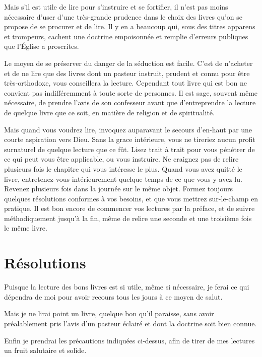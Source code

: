 \documentclass[instructions.tex]{subfiles}
\begin{document}
\tertio Mais s'il est utile de lire pour s'instruire et se fortifier, il n'est pas moins nécessaire d'user d'une très-grande prudence dans le choix des livres qu'on se propose de se procurer et de lire. Il y en a beaucoup qui, sous des titres apparens et trompeurs, cachent une doctrine empoisonnée et remplie d'erreurs publiques que l'Église a proscrites.
 
Le moyen de se préserver du danger de la séduction est facile. C'est de n'acheter et de ne lire que des livres dont un pasteur instruit, prudent et connu pour être très-orthodoxe, vous conseillera la lecture. Cependant tout livre qui est bon ne convient pas indifféremment à toute sorte de personnes. Il est sage, souvent même nécessaire, de prendre l'avis de son confesseur avant que d'entreprendre la lecture de quelque livre que ce soit, en matière de religion et de spiritualité.
 
\quarto Mais quand vous voudrez lire, invoquez auparavant le secours d'en-haut par une courte aspiration vers Dieu. Sans la grace intérieure, vous ne tireriez aucun profit surnaturel de quelque lecture que ce fût. Lisez trait à trait pour vous pénétrer de ce qui peut vous être applicable, ou vous instruire. Ne craignez pas de relire plusieurs fois le chapitre qui vous intéresse le plus. Quand vous avez quitté le livre, entretenez-vous intérieurement quelque temps de ce que vous y avez lu. Revenez plusieurs fois dans la journée sur le même objet. Formez toujours quelques résolutions conformes à vos besoins, et que vous mettrez sur-le-champ en pratique. Il est bon encore de commencer vos lectures par la préface, et de suivre méthodiquement jusqu'à la fin, même de relire une seconde et une troisième fois le même livre.
 
\section{Résolutions}
 
\primo Puisque la lecture des bons livres est si utile, même si nécessaire, je ferai ce qui dépendra de moi pour avoir recours tous les jours à ce moyen de salut. 

\secundo Mais je ne lirai point un livre, quelque bon qu'il paraisse, sans avoir préalablement pris l'avis d'un pasteur éclairé et dont la doctrine soit bien connue. 

\tertio Enfin je prendrai les précautions indiquées ci-dessus, afin de tirer de mes lectures un fruit salutaire et solide. 

 
\end{document}

